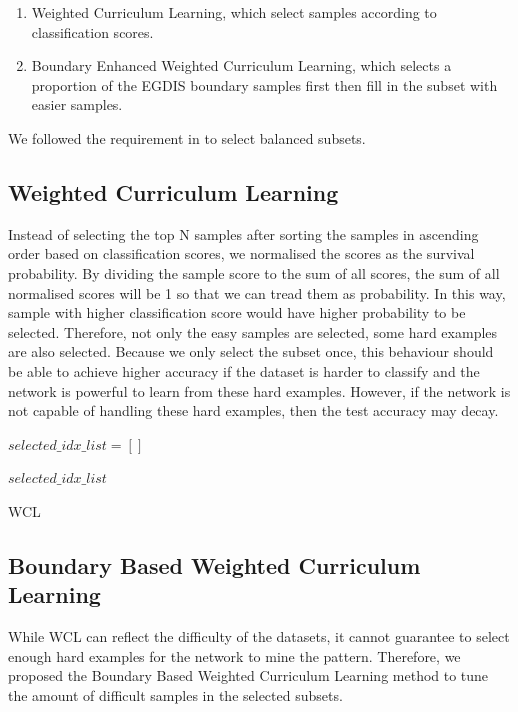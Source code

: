 \begin{enumerate}
\item Weighted Curriculum Learning, which select samples according to classification scores.
\item Boundary Enhanced Weighted Curriculum Learning, which selects a proportion of the EGDIS boundary samples first then fill in the subset with easier samples.
\end{enumerate}

We followed the requirement in \cite{Hacohen2019a} to select balanced subsets.

\subsection{Weighted Curriculum Learning}
Instead of selecting the top N samples after sorting the samples in ascending order based on classification scores, we normalised the scores as the survival probability. By dividing the sample score to the sum of all scores, the sum of all normalised scores will be 1 so that we can tread them as probability. In this way, sample with higher classification score would have higher probability to be selected. Therefore, not only the easy samples are selected, some hard examples are also selected. Because we only select the subset once, this behaviour should be able to achieve higher accuracy if the dataset is harder to classify and the network is powerful to learn from these hard examples. However, if the network is not capable of handling these hard examples, then the test accuracy may decay.





\begin{algorithm}[H]

$selected\_idx\_list = []$ \;



\Return $selected\_idx\_list$ \;

\caption{WCL}
\end{algorithm}

\subsection{Boundary Based Weighted Curriculum Learning}
While WCL can reflect the difficulty of the datasets, it cannot guarantee to select enough hard examples for the network to mine the pattern. Therefore, we proposed the Boundary Based Weighted Curriculum Learning method to tune the amount of difficult samples in the selected subsets.

